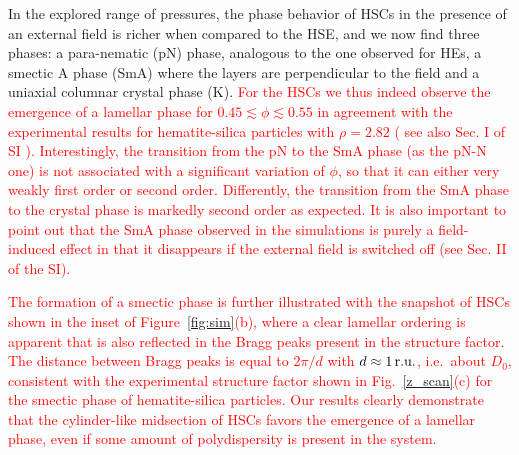 \documentclass[aps,prl,preprint,superscriptaddress]{revtex4-1} %
\begin{document}
{\color{green}In the explored range of pressures,} the phase behavior of HSCs in the presence of an external field is richer 
when compared to the HSE, and we now find three phases: a para-nematic (pN) 
phase, analogous to the one observed for HEs, a smectic A phase (SmA) where the layers 
are perpendicular to the field and a uniaxial columnar crystal phase (K).
\textcolor{red}{For the HSCs we thus indeed observe the emergence of a lamellar phase for $0.45\lesssim\phi\lesssim 0.55$ 
  in agreement with the experimental results for hematite-silica particles with $\rho=2.82$ ({\color{green} see also Sec. I of SI }).
Interestingly, the transition from the pN to the SmA phase (as the pN-N one) 
is not associated with a significant variation of $\phi$, so that it can either
very weakly first order or second order. Differently, the transition from the SmA phase to the crystal phase
is markedly second order as expected. It is also important to point out that the SmA phase observed in the simulations is purely a field-induced effect in that
it disappears if the external field is switched off ({\color{green}see Sec. II of the SI}). }

\textcolor{red}{The formation of a smectic phase is further illustrated with the snapshot of HSCs shown in the inset of Figure~\ref{fig:sim}(b), where a clear lamellar ordering is apparent that is also reflected in the Bragg peaks present in the structure factor.
The distance between Bragg peaks is equal to $2\pi/d$ with $d\approx 1\,\hbox{r.u.}$, i.e.~about $D_0$, consistent with the experimental structure
factor shown in Fig.~\ref{z_scan}(c) for the smectic phase of hematite-silica particles.
Our results clearly demonstrate that the cylinder-like midsection of HSCs favors the emergence of a lamellar phase,
even if some amount of polydispersity is present in the system. }

\end{document}
